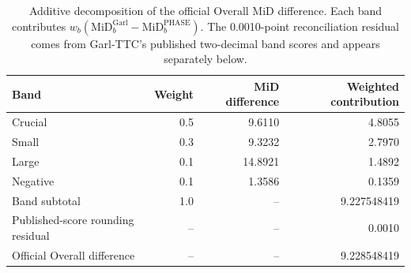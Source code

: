 \begin{table}[H]
\centering\small
\caption{Additive decomposition of the official Overall MiD difference. Each band contributes $w_b(\mathrm{MiD}^{\mathrm{Garl}}_b-\mathrm{MiD}^{\mathrm{PHASE}}_b)$. The 0.0010-point reconciliation residual comes from Garl-TTC's published two-decimal band scores and appears separately below. }
\label{tab:official-weighted-contributions}
\begin{tabular}{lrrr}
\toprule
\textbf{Band} & \textbf{Weight} & \textbf{MiD difference} & \textbf{Weighted contribution} \\
\midrule
Crucial & 0.5 & 9.6110 & 4.8055 \\
Small & 0.3 & 9.3232 & 2.7970 \\
Large & 0.1 & 14.8921 & 1.4892 \\
Negative & 0.1 & 1.3586 & 0.1359 \\
\midrule
Band subtotal & 1.0 & -- & 9.227548419 \\ 
Published-score rounding residual & -- & -- & 0.0010 \\ 
Official Overall difference & -- & -- & 9.228548419 \\ 
\bottomrule
\end{tabular}
\end{table}

